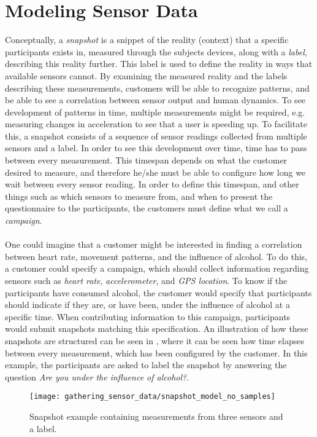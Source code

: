 
\section{Modeling Sensor Data}
\label{sec:modeling_sensor_data}

Conceptually, a \emph{snapshot} is a snippet of the reality (context) that a specific participants exists in, measured through the subjects devices, along with a \emph{label}, describing this reality further. This label is used to define the reality in ways that available sensors cannot. By examining the measured reality and the labels describing these measurements, customers will be able to recognize patterns, and be able to see a correlation between sensor output and human dynamics. To see development of patterns in time, multiple measurements might be required, e.g. measuring changes in acceleration to see that a user is speeding up. To facilitate this, a snapshot consists of a sequence of sensor readings collected from multiple sensors and a label. In order to see this development over time, time has to pass between every measurement. This timespan depends on what the customer desired to measure, and therefore he/she must be able to configure how long we wait between every sensor reading. In order to define this timespan, and other things such as which sensors to measure from, and when to present the questionnaire to the participants, the customers must define what we call a \emph{campaign}.
\\\\
One could imagine that a customer might be interested in finding a correlation between heart rate, movement patterns, and the influence of alcohol. To do this, a customer could specify a campaign, which should collect information regarding sensors such as \emph{heart rate}, \emph{accelerometer}, and \emph{GPS location}. To know if the participants have consumed alcohol, the customer would specify that participants should indicate if they are, or have been, under the influence of alcohol at a specific time. When contributing information to this campaign, participants would submit snapshots matching this specification. An illustration of how these snapshots are structured can be seen in , where it can be seen how time elapses between every measurement, which has been configured by the customer. In this example, the participants are asked to label the snapshot by answering the question \emph{Are you under the influence of alcohol?}.
\\
\begin{figure}[!htbp]
    \centering
    \texttt{[image: gathering\_sensor\_data/snapshot\_model\_no\_samples]}
    \caption{Snapshot example containing measurements from three sensors and a label.}
    \label{fig:snapshot_model_no_samples}
\end{figure}
\FloatBarrier

